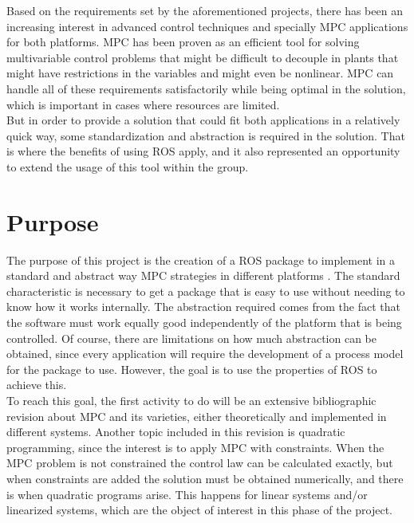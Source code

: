 Based on the requirements set by the aforementioned projects, there has been an increasing interest in advanced control techniques and specially MPC applications for both platforms. MPC has been proven as an efficient tool for solving multivariable control problems that might be difficult to decouple in plants that might have restrictions in the variables and might even be nonlinear. MPC can handle all of these requirements satisfactorily while being optimal in the solution, which is important in cases where resources are limited.\\




But in order to provide a solution that could fit both applications in a relatively quick way, some standardization and abstraction is required in the solution. That is where the benefits of using ROS apply, and it also represented an opportunity to extend the usage of this tool within the group.


\section{Purpose}

The purpose of this project is the creation of a ROS package to implement in a standard and abstract way MPC strategies in different platforms . The standard characteristic is necessary to get a package that is easy to use without needing to know how it works internally. The abstraction required comes from the fact that the software must work equally good independently of the platform that is being controlled. Of course, there are limitations on how much abstraction can be obtained, since every application will require the development of a process model for the package to use. However, the goal is to use the properties of ROS to achieve this.\\

To reach this goal, the first activity to do will be an extensive bibliographic revision about MPC and its varieties, either theoretically and implemented in different systems. Another topic included in this revision is quadratic programming, since the interest is to apply MPC with constraints. When the MPC problem is not constrained the control law can be calculated exactly, but when constraints are added the solution must be obtained numerically, and there is when quadratic programs arise. This happens for linear systems and/or linearized systems, which are the object of interest in this phase of the project.\\

